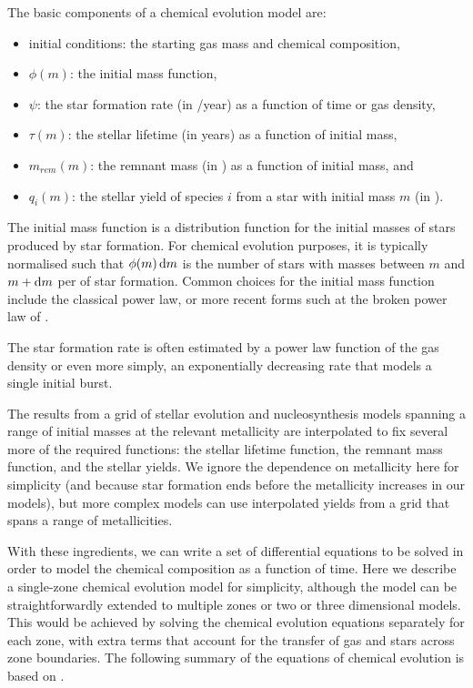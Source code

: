 The basic components of a chemical evolution model are:
\begin{itemize}
\item initial conditions: the starting gas mass and chemical composition,
\item $\phi(m)$: the initial mass function,
\item $\psi$: the star formation rate (in \Msun/year) as a function of time or gas density,
\item $\tau(m)$: the stellar lifetime (in years) as a function of initial mass,
\item $m_{rem}(m)$: the remnant mass (in \Msun) as a function of initial mass, and
\item $q_i(m)$: the stellar yield of species $i$ from a star with initial mass $m$ (in \Msun).
\end{itemize}

The initial mass function is a distribution function for the initial masses of stars produced by star formation. For chemical evolution purposes, it is typically normalised such that $\phi(m) \,\mathrm{d} m$ is the number of stars with masses between $m$ and $m + \mathrm{d} m$ per \Msun of star formation. Common choices for the initial mass function include the classical \citet{Salpeter:1955hz} power law, or more recent forms such at the broken power law of \citet{Kroupa:1993tm}.

The star formation rate is often estimated by a power law function of the gas density \citep{Schmidt:1959bp,Kennicutt:2012ey} or even more simply, an exponentially decreasing rate that models a single initial burst.

The results from a grid of stellar evolution and nucleosynthesis models spanning a range of initial masses at the relevant metallicity are interpolated to fix several more of the required functions: the stellar lifetime function, the remnant mass function, and the stellar yields. We ignore the dependence on metallicity here for simplicity (and because star formation ends before the metallicity increases in our models), but more complex models can use interpolated yields from a grid that spans a range of metallicities.

With these ingredients, we can write a set of differential equations to be solved in order to model the chemical composition as a function of time. Here we describe a single-zone chemical evolution model for simplicity, although the model can be straightforwardly extended to multiple zones or two or three dimensional models. This would be achieved by solving the chemical evolution equations separately for each zone, with extra terms that account for the transfer of gas and stars across zone boundaries. The following summary of the equations of chemical evolution is based on \citet[][Chapter 7]{Pagel:2009ws}. 

